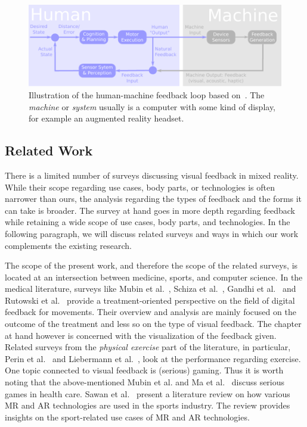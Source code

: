 \begin{figure}[tb]
    \centering
    \includegraphics[width=1\linewidth]{pictures/feedbackloop.pdf}
    \caption{Illustration of the human-machine feedback loop based on~\cite{morone2021dab}\label{fig:feedback}. The \emph{machine} or \emph{system} usually is a computer with some kind of display, for example an augmented reality headset.}
\end{figure}

\subsection{Related Work\label{sec:relatedwork}}
There is a limited number of surveys discussing visual feedback in mixed reality. While their scope regarding use cases, body parts, or technologies is often narrower than ours, the analysis regarding the types of feedback and the forms it can take is broader. The survey at hand goes in more depth regarding feedback while retaining a wide scope of use cases, body parts, and technologies. In the following paragraph, we will discuss related surveys and ways in which our work complements the existing research.

The scope of the present work, and therefore the scope of the related surveys, is located at an intersection between medicine, sports, and computer science. In the medical literature, surveys like Mubin et al.~\cite{mubin2020esg}, Schiza et al.~\cite{schiza2019vra}, Gandhi et al.~\cite{gandhi2020mts} and Rutowski et al.~\cite{rutkowski2020uvr} provide a treatment-oriented perspective on the field of digital feedback for movements. Their overview and analysis are mainly focused on the outcome of the treatment and less so on the type of visual feedback. The chapter at hand however is concerned with the visualization of the feedback given. Related surveys from the \emph{physical exercise} part of the literature, in particular, Perin et al.~\cite{perin2018sas} and Liebermann et al.~\cite{liebermann2002aai}, look at the performance regarding exercise.
One topic connected to visual feedback is (serious) gaming. Thus it is worth noting that the above-mentioned Mubin et al. \cite{mubin2020esg} and Ma et al.~\cite{ma2011vrp} discuss serious games in health care. Sawan et al.~\cite{Sawan2016MRS} present a literature review on how various MR and AR technologies are used in the sports industry. The review provides insights on the sport-related use cases of MR and AR technologies.

